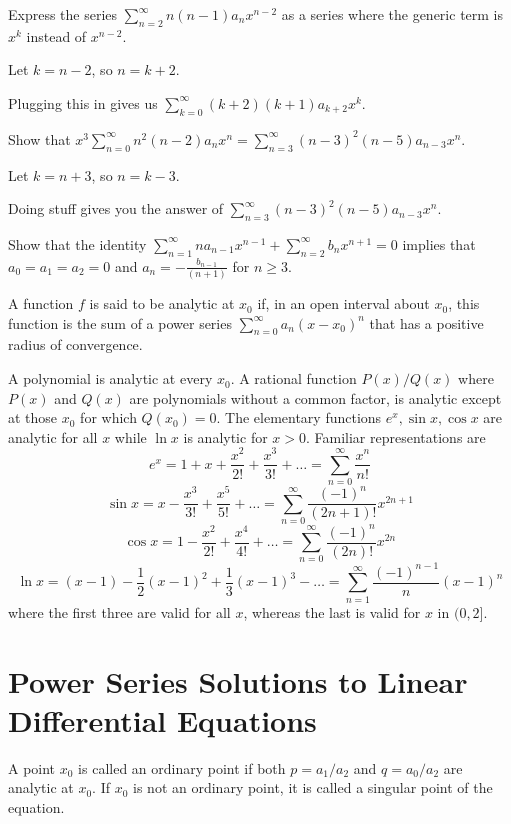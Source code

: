 \documentclass[../diffeq.tex]{subfiles}
\begin{document}
\begin{example}
    Express the series $\sum_{n=2}^{\infty}n(n-1)a_n x^{n-2}$ as a series where the generic term is $x^k$ instead of $x^{n-2}$.

    Let $k=n-2$, so $n=k+2$.

    Plugging this in gives us $\sum_{k=0}^{\infty}(k+2)(k+1)a_{k+2}x^k$.
\end{example}

\begin{example}
    Show that $x^3\sum_{n=0}^{\infty} n^2(n-2)a_nx^n = \sum_{n=3}^{\infty}(n-3)^2(n-5)a_{n-3}x^n$.

    Let $k=n+3$, so $n=k-3$.

    Doing stuff gives you the answer of $\sum_{n=3}^{\infty}(n-3)^2(n-5)a_{n-3}x^n$.
\end{example}

\ex Show that the identity $\sum_{n=1}^{\infty}na_{n-1}x^{n-1}+\sum_{n=2}^{\infty}b_nx^{n+1}=0$ implies that $a_0=a_1=a_2=0$ and $a_n=-\frac{b_{n-1}}{(n+1)}$ for $n\geq 3$.

\begin{definition}
    A function $f$ is said to be analytic at $x_0$ if, in an open interval about $x_0$, this function is the sum of a power series $\sum_{n=0}^{\infty}a_n(x-x_0)^n$ that has a positive radius of convergence.
\end{definition}

A polynomial is analytic at every $x_0$. A rational function $P(x)/Q(x)$ where $P(x)$ and $Q(x)$ are polynomials without a common factor, is analytic except at those $x_0$ for which $Q(x_0)=0$.
The elementary functions $e^x,\sin x,\cos x$ are analytic for all $x$ while $\ln x$ is analytic for $x>0$. Familiar representations are 
\[ e^x = 1+x+\frac{x^2}{2!}+\frac{x^3}{3!}+\dots = \sum_{n=0}^{\infty} \frac{x^n}{n!} \]
\[ \sin x = x-\frac{x^3}{3!}+\frac{x^5}{5!}+\dots = \sum_{n=0}^{\infty} \frac{(-1)^n}{(2n+1)!}x^{2n+1} \]
\[ \cos x = 1-\frac{x^2}{2!}+\frac{x^4}{4!}+\dots = \sum_{n=0}^{\infty} \frac{(-1)^n}{(2n)!}x^{2n} \]
\[ \ln x = (x-1)-\frac{1}{2}(x-1)^2+\frac{1}{3}(x-1)^3 - \dots = \sum_{n=1}^{\infty}\frac{(-1)^{n-1}}{n}(x-1)^n \]
where the first three are valid for all $x$, whereas the last is valid for $x$ in $(0,2]$.



\section{Power Series Solutions to Linear Differential Equations}
\begin{definition}
    A point $x_0$ is called an ordinary point if both $p=a_1/a_2$ and $q=a_0/a_2$ are analytic at $x_0$. If $x_0$ is not an ordinary point, it is called a singular point of the equation.
\end{definition}
\end{document}
